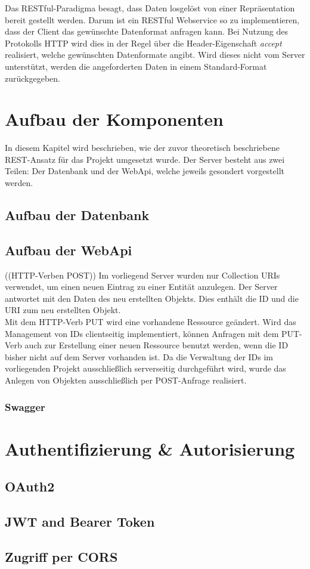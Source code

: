 Das RESTful-Paradigma besagt, dass Daten losgelöst von einer Repräsentation bereit gestellt werden. Darum ist ein RESTful Webservice so zu implementieren, dass der Client das gewünschte Datenformat anfragen kann. Bei Nutzung des Protokolls HTTP wird dies in der Regel über die Header-Eigenschaft \textit{accept} realisiert, welche gewünschten Datenformate angibt. Wird dieses nicht vom Server unterstützt, werden die angeforderten Daten in einem Standard-Format zurückgegeben. 
\section{Aufbau der Komponenten}
\label{sec:aufbau-Komponenten}
In diesem Kapitel wird beschrieben, wie der zuvor theoretisch beschriebene REST-Ansatz für das Projekt umgesetzt wurde. Der Server besteht aus zwei Teilen: Der Datenbank und der WebApi, welche jeweils gesondert vorgestellt werden.
\subsection{Aufbau der Datenbank}
\label{ssec:aufbau-server-db}

\subsection{Aufbau der WebApi}
\label{ssec:aufbau-webapi}


((HTTP-Verben POST))
Im vorliegend Server wurden nur Collection URIs verwendet, um einen neuen Eintrag zu einer Entität anzulegen. Der Server antwortet mit den Daten des neu erstellten Objekts. Dies enthält die ID und die URI zum neu erstellten Objekt.\\
Mit dem HTTP-Verb PUT wird eine vorhandene Ressource geändert. Wird das Management von IDs clientseitig implementiert, können Anfragen mit dem PUT-Verb auch zur Erstellung einer neuen Ressource benutzt werden, wenn die ID bisher nicht auf dem Server vorhanden ist. Da die Verwaltung der IDs im vorliegenden Projekt ausschließlich serverseitig durchgeführt wird, wurde das Anlegen von Objekten ausschließlich per POST-Anfrage realisiert. 


\subsubsection*{Swagger}
\label{sssec:Swagger}

\section{Authentifizierung \& Autorisierung}
\label{sec:server-authorisierung}

\subsection{OAuth2}
\label{ssec:oauth2}

\subsection{JWT and Bearer Token}
\label{ssec:jwt-bearer}

\subsection{Zugriff per CORS}
\label{ssec:cors}